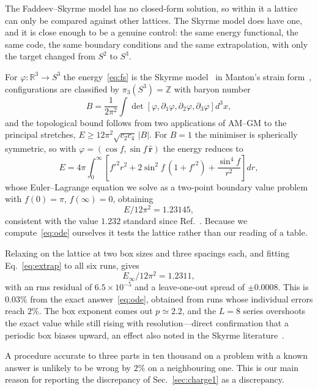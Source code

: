 \documentclass[aps,prd,preprint,nofootinbib,longbibliography]{revtex4-2}
\begin{document}
The Faddeev--Skyrme model has no closed-form solution, so within it a lattice can
only be compared against other lattices. The Skyrme model does have one, and it
is close enough to be a genuine control: the same energy functional, the same
code, the same boundary conditions and the same extrapolation, with only the
target changed from $S^2$ to $S^3$.

For $\varphi:\mathbb{R}^3\to S^3$ the energy~\eqref{eq:fs} is the Skyrme
model~\cite{skyrme1961} in Manton's strain form~\cite{manton1987}, configurations
are classified by $\pi_3(S^3)=\mathbb{Z}$ with baryon number
\begin{equation}
B=\frac{1}{2\pi^2}\int
\det\!\left[\varphi,\partial_1\varphi,\partial_2\varphi,\partial_3\varphi\right]d^3x,
\end{equation}
and the topological bound follows from two applications of AM--GM to the
principal stretches, $E\ge12\pi^2\sqrt{c_2c_4}\,|B|$. For $B=1$ the minimiser is
spherically symmetric, so with $\varphi=(\cos f,\sin f\,\hat{\bm r})$ the energy
reduces to
\begin{equation}
E = 4\pi\!\int_0^\infty\!\!\left[f'^2r^2 + 2\sin^2\!f\,(1+f'^2)
 + \frac{\sin^4\!f}{r^2}\right]dr ,
\end{equation}
whose Euler--Lagrange equation we solve as a two-point boundary value problem
with $f(0)=\pi$, $f(\infty)=0$, obtaining
\begin{equation}
E/12\pi^2 = 1.23145 ,
\label{eq:ode}
\end{equation}
consistent with the value $1.232$ standard since Ref.~\cite{adkins1983}. Because
we compute~\eqref{eq:ode} ourselves it tests the lattice rather than our reading
of a table.

Relaxing on the lattice at two box sizes and three spacings each, and fitting
Eq.~\eqref{eq:extrap} to all six runs, gives
\begin{equation}
E_\infty/12\pi^2 = 1.2311 ,
\end{equation}
with an rms residual of $6.5\times10^{-5}$ and a leave-one-out spread of
$\pm0.0008$. This is $0.03\%$ from the exact answer~\eqref{eq:ode}, obtained from
runs whose individual errors reach $2\%$. The box exponent comes out
$p\simeq2.2$, and the $L=8$ series overshoots the exact value while still rising
with resolution---direct confirmation that a periodic box biases upward, an
effect also noted in the Skyrme literature~\cite{battye2002}.

A procedure accurate to three parts in ten thousand on a problem with a known
answer is unlikely to be wrong by $2\%$ on a neighbouring one. This is our main
reason for reporting the discrepancy of Sec.~\ref{sec:charge1} as a discrepancy.
\end{document}

